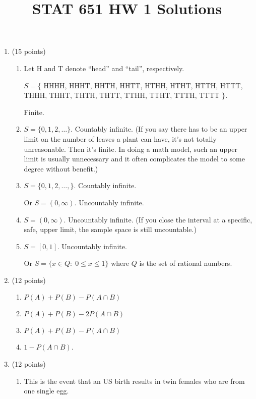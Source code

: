 \documentclass[12pt]{article}
\begin{document}
\title{STAT 651 HW 1 Solutions}
\maketitle

\begin{enumerate}

\item (15 points)
\begin{enumerate}
\item
Let H and T denote ``head'' and ``tail'', respectively.

$S = \bigl\{$%
HHHH, HHHT, HHTH, HHTT, HTHH, HTHT, HTTH, HTTT,
THHH, THHT, THTH, THTT, TTHH, TTHT, TTTH, TTTT%
$\bigr\}$.

Finite.

\item
$S = \{0,1,2,\dotsc\}$.
Countably infinite.
(If you say there has to be an upper limit on the number of leaves a
plant can have, it's not totally unreasonable. Then it's finite.
In doing a math model, such an upper limit is usually unnecessary
and it often complicates the model to some degree without benefit.)

\item
$S = \{0, 1, 2,\dotsc,\}$. Countably infinite.

Or
$S = (0,\infty)$. Uncountably infinite.

\item
$S = (0, \infty)$. Uncountably infinite.
(If you close the interval at a specific, safe, upper limit,
the sample space is still uncountable.)

\item
$S = [0,1]$. Uncountably infinite.

Or $S = \{x \in Q:\; 0 \le x \le 1\}$
where $Q$ is the set of rational numbers.

\end{enumerate}

\item (12 points)
\begin{enumerate}
\item $P(A) + P(B) - P(A\cap B)$
\item $P(A) + P(B) - 2P(A\cap B)$
\item $P(A) + P(B) - P(A\cap B)$
\item $1 - P(A\cap B)$.
\end{enumerate}

\item (12 points)
\begin{enumerate}
\item
This is the event that an US birth results in twin females
who are from one single egg.


\end{enumerate}
\end{enumerate}
\end{document}
